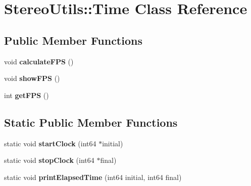 \hypertarget{class_stereo_utils_1_1_time}{}\section{Stereo\+Utils\+:\+:Time Class Reference}
\label{class_stereo_utils_1_1_time}
\subsection*{Public Member Functions}
\begin{DoxyCompactItemize}
\item 
void {\bfseries calculate\+F\+PS} ()\hypertarget{class_stereo_utils_1_1_time_a73878c0fe0d43a42917e2f880e80c0d7}{}\label{class_stereo_utils_1_1_time_a73878c0fe0d43a42917e2f880e80c0d7}

\item 
void {\bfseries show\+F\+PS} ()\hypertarget{class_stereo_utils_1_1_time_a3ce678ed6e10245596b42550633b1fcd}{}\label{class_stereo_utils_1_1_time_a3ce678ed6e10245596b42550633b1fcd}

\item 
int {\bfseries get\+F\+PS} ()\hypertarget{class_stereo_utils_1_1_time_a805a1e98d58772c5f4f3bec4cfd3aeb4}{}\label{class_stereo_utils_1_1_time_a805a1e98d58772c5f4f3bec4cfd3aeb4}

\end{DoxyCompactItemize}
\subsection*{Static Public Member Functions}
\begin{DoxyCompactItemize}
\item 
static void {\bfseries start\+Clock} (int64 $\ast$initial)\hypertarget{class_stereo_utils_1_1_time_ad6a26260d6e34218f2f89484f47c6bb2}{}\label{class_stereo_utils_1_1_time_ad6a26260d6e34218f2f89484f47c6bb2}

\item 
static void {\bfseries stop\+Clock} (int64 $\ast$final)\hypertarget{class_stereo_utils_1_1_time_ae7d01a28068e42411b17de25ffa4717f}{}\label{class_stereo_utils_1_1_time_ae7d01a28068e42411b17de25ffa4717f}

\item 
static void {\bfseries print\+Elapsed\+Time} (int64 initial, int64 final)\hypertarget{class_stereo_utils_1_1_time_affb80835fb8675cf64b155471caa8fa3}{}\label{class_stereo_utils_1_1_time_affb80835fb8675cf64b155471caa8fa3}

\end{DoxyCompactItemize}
